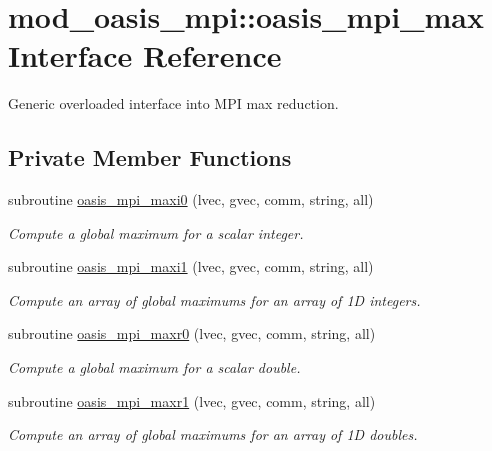 \hypertarget{interfacemod__oasis__mpi_1_1oasis__mpi__max}{}\section{mod\+\_\+oasis\+\_\+mpi\+:\+:oasis\+\_\+mpi\+\_\+max Interface Reference}
\label{interfacemod__oasis__mpi_1_1oasis__mpi__max}


Generic overloaded interface into M\+PI max reduction.  


\subsection*{Private Member Functions}
\begin{DoxyCompactItemize}
\item 
subroutine \hyperlink{interfacemod__oasis__mpi_1_1oasis__mpi__max_a713608b4fe433467df0eaa3bdf84ec11}{oasis\+\_\+mpi\+\_\+maxi0} (lvec, gvec, comm, string, all)
\begin{DoxyCompactList}\small\item\em Compute a global maximum for a scalar integer. \end{DoxyCompactList}\item 
subroutine \hyperlink{interfacemod__oasis__mpi_1_1oasis__mpi__max_a3b47b877c66859e93a366d76769e7c16}{oasis\+\_\+mpi\+\_\+maxi1} (lvec, gvec, comm, string, all)
\begin{DoxyCompactList}\small\item\em Compute an array of global maximums for an array of 1D integers. \end{DoxyCompactList}\item 
subroutine \hyperlink{interfacemod__oasis__mpi_1_1oasis__mpi__max_abe9d60c763e34813e83ad556b5ae679a}{oasis\+\_\+mpi\+\_\+maxr0} (lvec, gvec, comm, string, all)
\begin{DoxyCompactList}\small\item\em Compute a global maximum for a scalar double. \end{DoxyCompactList}\item 
subroutine \hyperlink{interfacemod__oasis__mpi_1_1oasis__mpi__max_a4bd1cea5e9e55f3795538b1a44bdb6e4}{oasis\+\_\+mpi\+\_\+maxr1} (lvec, gvec, comm, string, all)
\begin{DoxyCompactList}\small\item\em Compute an array of global maximums for an array of 1D doubles. \end{DoxyCompactList}\end{DoxyCompactItemize}


